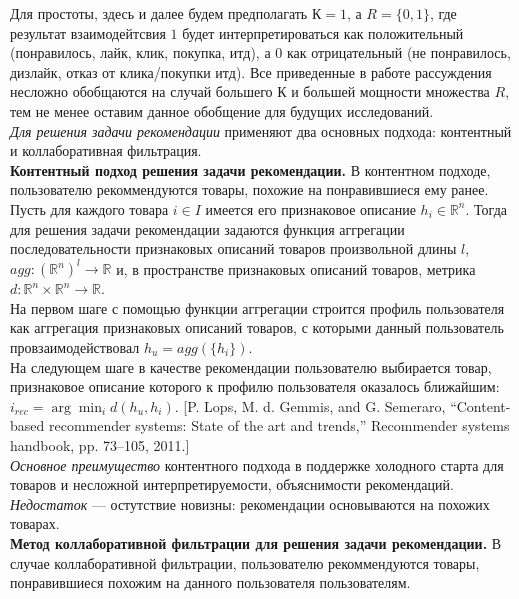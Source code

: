 \documentclass{mipt-thesis-ms}
\begin{document}
Для простоты, здесь и далее будем предполагать $К = 1$, а $R = \{0, 1\}$, где результат взаимодейтсвия $1$ будет интерпретироваться как положительный (понравилось, лайк, клик, покупка, итд), а $0$ как отрицательный (не понравилось, дизлайк, отказ от клика/покупки итд). Все приведенные в работе рассуждения несложно обобщаются на случай большего $К$ и большей мощности множества $R$, тем не менее оставим данное обобщение для будущих исследований.\\

{\it Для решения задачи рекомендации} применяют два основных подхода: контентный и коллаборативная фильтрация.
\\

{\bf Контентный подход решения задачи рекомендации.} В контентном подходе, пользователю рекоммендуются товары, похожие на понравившиеся ему ранее.\\

Пусть для каждого товара $i \in I$ имеется его признаковое описание $h_i \in \mathbb{R}^n$. Тогда для решения задачи рекомендации задаются функция аггрегации последовательности признаковых описаний товаров произвольной длины $l$, $agg: (\mathbb{R}^n)^l \rightarrow \mathbb{R}$ и, в пространстве признаковых описаний товаров, метрика $d: \mathbb{R}^n \times \mathbb{R}^n \rightarrow \mathbb{R}$. \\
На первом шаге с помощью функции аггрегации строится профиль пользователя как аггрегация признаковых описаний товаров, с которыми данный пользователь провзаимодействовал $h_u = agg(\{h_i\})$. \\
На следующем шаге в качестве рекомендации пользователю выбирается товар, признаковое описание которого к профилю пользователя оказалось ближайшим: $i_{rec} = \arg \min_i d(h_u, h_i)$. [P. Lops, M. d. Gemmis, and G. Semeraro, “Content-based recommender systems: State of the art and trends,”
Recommender systems handbook, pp. 73–105, 2011.]\\

{\it Основное преимущество} контентного подхода в поддержке холодного старта для товаров и несложной интерпретируемости, объяснимости рекомендаций. {\it Недостаток} --- остутствие новизны: рекомендации основываются на похожих товарах.\\

{\bf Метод коллаборативной фильтрации для решения задачи рекомендации.} В случае коллаборативной фильтрации, пользователю рекоммендуются товары, понравившиеся похожим на данного пользователя пользователям.\\
\end{document}
